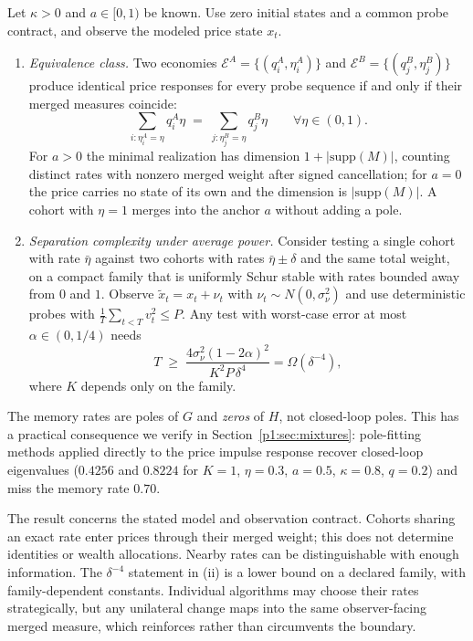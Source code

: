 \begin{theorem}\label{p1:thm:merged}
Let $\kappa>0$ and $a\in[0,1)$ be known. Use zero initial states and a common probe contract, and observe the modeled price state $x_t$.
\begin{enumerate}[label=(\roman*)]
\item \emph{Equivalence class.} Two economies $\mathcal E^A=\{(q_i^A,\eta_i^A)\}$ and $\mathcal E^B=\{(q_j^B,\eta_j^B)\}$ produce identical price responses for every probe sequence if and only if their merged measures coincide:
\begin{equation}\label{p1:eq:merged}
\sum_{i:\eta_i^A=\eta} q_i^A\eta \;=\; \sum_{j:\eta_j^B=\eta} q_j^B\eta\qquad\forall\eta\in(0,1).
\end{equation}
For $a>0$ the minimal realization has dimension $1+|\mathrm{supp}(M)|$, counting distinct rates with nonzero merged weight after signed cancellation; for $a=0$ the price carries no state of its own and the dimension is $|\mathrm{supp}(M)|$. A cohort with $\eta=1$ merges into the anchor $a$ without adding a pole.
\item \emph{Separation complexity under average power.} Consider testing a single cohort with rate $\bar\eta$ against two cohorts with rates $\bar\eta\pm\delta$ and the same total weight, on a compact family that is uniformly Schur stable with rates bounded away from $0$ and $1$. Observe $\tilde x_t=x_t+\nu_t$ with $\nu_t\sim N(0,\sigma_\nu^2)$ and use deterministic probes with $\frac1T\sum_{t<T}v_t^2\le P$. Any test with worst-case error at most $\alpha\in(0,1/4)$ needs
\begin{equation}\label{p1:eq:Tpower}
T\;\ge\;\frac{4\sigma_\nu^2(1-2\alpha)^2}{K^2P\,\delta^4}=\Omega(\delta^{-4}),
\end{equation}
where $K$ depends only on the family.
\end{enumerate}
\end{theorem}

The memory rates are poles of $G$ and \emph{zeros} of $H$, not closed-loop poles. This has a practical consequence we verify in Section~\ref{p1:sec:mixtures}: pole-fitting methods applied directly to the price impulse response recover closed-loop eigenvalues ($0.4256$ and $0.8224$ for $K=1$, $\eta=0.3$, $a=0.5$, $\kappa=0.8$, $q=0.2$) and miss the memory rate $0.70$.

\begin{remark}[Scope]\label{p1:rem:scope}
The result concerns the stated model and observation contract. Cohorts sharing an exact rate enter prices through their merged weight; this does not determine identities or wealth allocations. Nearby rates can be distinguishable with enough information. The $\delta^{-4}$ statement in (ii) is a lower bound on a declared family, with family-dependent constants. Individual algorithms may choose their rates strategically, but any unilateral change maps into the same observer-facing merged measure, which reinforces rather than circumvents the boundary.
\end{remark}

